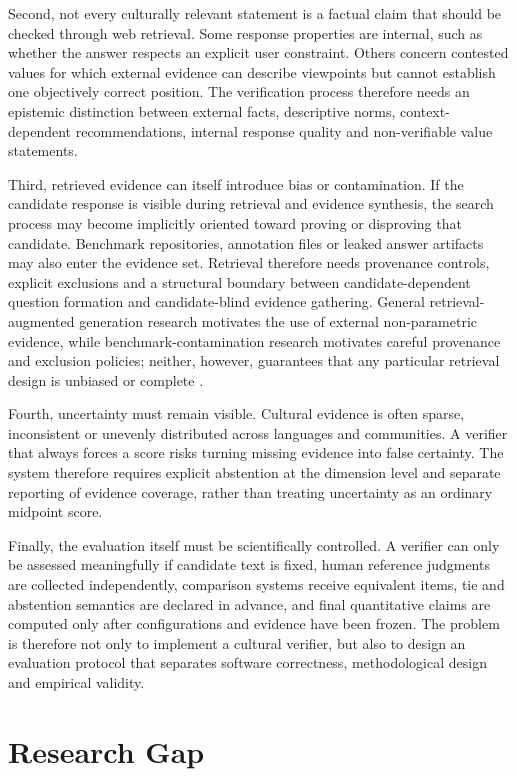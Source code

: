 Second, not every culturally relevant statement is a factual claim that should be checked through web retrieval. Some response properties are internal, such as whether the answer respects an explicit user constraint. Others concern contested values for which external evidence can describe viewpoints but cannot establish one objectively correct position. The verification process therefore needs an epistemic distinction between external facts, descriptive norms, context-dependent recommendations, internal response quality and non-verifiable value statements.

Third, retrieved evidence can itself introduce bias or contamination. If the candidate response is visible during retrieval and evidence synthesis, the search process may become implicitly oriented toward proving or disproving that candidate. Benchmark repositories, annotation files or leaked answer artifacts may also enter the evidence set. Retrieval therefore needs provenance controls, explicit exclusions and a structural boundary between candidate-dependent question formation and candidate-blind evidence gathering. General retrieval-augmented generation research motivates the use of external non-parametric evidence, while benchmark-contamination research motivates careful provenance and exclusion policies; neither, however, guarantees that any particular retrieval design is unbiased or complete \parencite{lewis2020rag,deng2024contamination}.

Fourth, uncertainty must remain visible. Cultural evidence is often sparse, inconsistent or unevenly distributed across languages and communities. A verifier that always forces a score risks turning missing evidence into false certainty. The system therefore requires explicit abstention at the dimension level and separate reporting of evidence coverage, rather than treating uncertainty as an ordinary midpoint score.

Finally, the evaluation itself must be scientifically controlled. A verifier can only be assessed meaningfully if candidate text is fixed, human reference judgments are collected independently, comparison systems receive equivalent items, tie and abstention semantics are declared in advance, and final quantitative claims are computed only after configurations and evidence have been frozen. The problem is therefore not only to implement a cultural verifier, but also to design an evaluation protocol that separates software correctness, methodological design and empirical validity.

\section{Research Gap}

